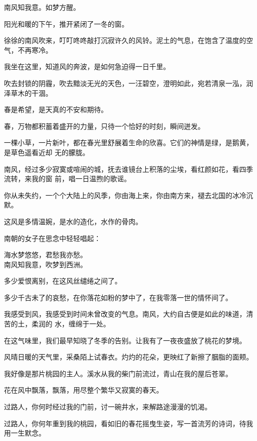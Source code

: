 	\endwriting



		南风知我意。如梦方醒。

		\vspace{1em}
		阳光和暖的下午，推开紧闭了一冬的窗。\par
		徐徐的南风吹来，叮叮咚咚敲打沉寂许久的风铃。泥土的气息，在饱含了温度的空气，不再寒冷。

		我坐在这里，知道风的奔波，是如何急迫得一日千里。

		吹去封锁的阴霾，吹去黯淡无光的天色，一汪碧空，澄明如此，宛若清泉一泓，润泽草木的干涸。\par
		春是希望，是天真的不安和期待。\par
		春，万物都积蓄着盛开的力量，只待一个恰好的时刻，瞬间迸发。

		一棵小草，一片新叶，都在春光里舒展着生命的欣喜。它们的神情是绿，是鹅黄，是草色遥看近却
	无的朦胧。

		南风，经过多少寂寞或喧闹的城，抚去谁镜台上积落的尘埃，看红颜如花，看四季流转，来我的窗
	前，唱一日温煦的歌谣。

		你从未失约，一个个大陆上的风季，你由海上来，你由南方来，褪去北国的冰冷沉默。\par
		这风是多情温婉，是水的造化，水作的骨肉。

		南朝的女子在思念中轻轻唱起：

		\shortpoem{}{}{}
			海水梦悠悠，君愁我亦愁。\\
			南风知我意，吹梦到西洲。\\
		\endshortpoem

		多少爱恨离别，在这风丝缱绻之间了。\par
		多少千古未了的哀愁，在你落花如粉的梦中了，在我零落一世的情怀间了。

		我感受到风，我感受到时间未曾改变的气息。南风，大约自古便是如此的味道，清苦的土，柔润的
	水，缠绵于一处。

		在这气味里，我们最早知晓了冬季的告别。让我有了一夜夜盛放了桃花的梦境。

		风晴日暖的天气里，采桑陌上试春衣。灼灼的花朵，更映红了新擦了胭脂的面颊。

		我好像是那片桃园的主人。溪水从我的柴门前流过，青山在我的屋后苍翠。\par
		花在风中飘落，飘落，用尽整个繁华又寂寞的春天。

		过路人，你何时经过我的门前，讨一碗井水，来解路途漫漫的饥渴。\par
		过路人，你何年重到我的桃园，看如旧的春花摇曳生姿，写一首流芳的诗词，待我用一生默念。

